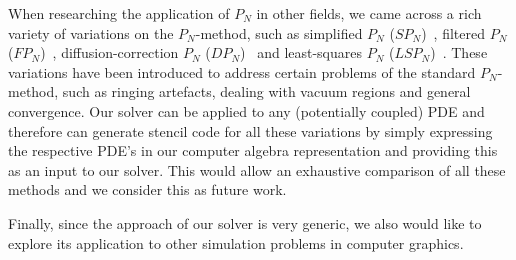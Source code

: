 When researching the application of $P_N$ in other fields, we came across a rich variety of variations on the $P_N$-method, such as simplified $P_N$ ($SP_N$)~\cite{Ryan10}, filtered $P_N$ ($FP_N$)~\cite{Radice13}, diffusion-correction $P_N$ ($DP_N$)~\cite{Schaefer11} and least-squares $P_N$ ($LSP_N$)~\cite{Hansen14}. These variations have been introduced to address certain problems of the standard $P_N$-method, such as ringing artefacts, dealing with vacuum regions and general convergence. Our solver can be applied to any (potentially coupled) PDE and therefore can generate stencil code for all these variations by simply expressing the respective PDE's in our computer algebra representation and providing this as an input to our solver. This would allow an exhaustive comparison of all these methods and we consider this as future work.

Finally, since the approach of our solver is very generic, we also would like to explore its application to other simulation problems in computer graphics.



